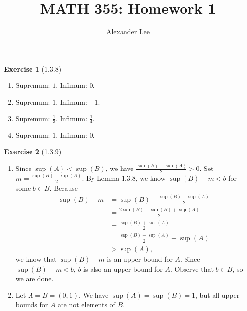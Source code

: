 \documentclass{amsart}
\title{MATH 355: Homework 1}
\author{Alexander Lee}
\theoremstyle{definition}
\newtheorem{exercise}{Exercise}
\begin{document}
\maketitle

\begin{exercise}[1.3.8]
  \begin{enumerate}[label={(\alph*)}]
    \item Supremum: $1$. Infimum: $0$.
    \item Supremum: $1$. Infimum: $-1$.
    \item Supremum: $\frac{1}{3}$. Infimum: $\frac{1}{4}$.
    \item Supremum: $1$. Infimum: $0$.
  \end{enumerate}
\end{exercise}

\begin{exercise}[1.3.9]
  \begin{enumerate}[label={(\alph*)}]
    \item Since $\sup(A) < \sup(B)$, we have $\frac{\sup(B) - \sup(A)}{2} > 0$.
      Set $m = \frac{\sup(B) - \sup(A)}{2}$. By Lemma 1.3.8, we know $\sup(B) -
      m < b$ for some $b \in B$. Because
      \begin{align*}
        \sup(B) - m &= \sup(B) - \frac{\sup(B) - \sup(A)}{2} \\
        &= \frac{2 \sup(B) - \sup(B) + \sup(A)}{2} \\
        &= \frac{\sup(B) + \sup(A)}{2} \\
        &= \frac{\sup(B) - \sup(A)}{2} + \sup(A) \\
        &> \sup(A),
      \end{align*}
      we know that $\sup(B) - m$ is an upper bound for $A$. Since $\sup(B) - m <
      b$, $b$ is also an upper bound for $A$. Observe that $b \in B$, so we are
      done.
    \item Let $A = B = (0, 1)$. We have $\sup(A) = \sup(B) = 1$, but all upper
      bounds for $A$ are not elements of $B$.
  \end{enumerate}
\end{exercise}
\end{document}
